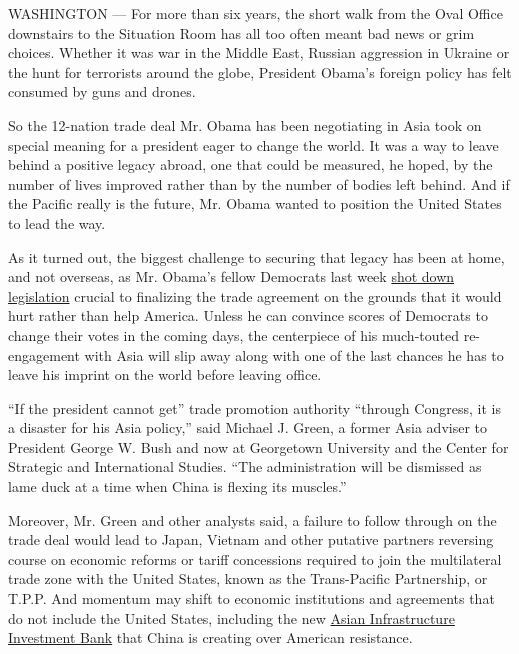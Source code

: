 WASHINGTON --- For more than six years, the short walk from the Oval
Office downstairs to the Situation Room has all too often meant bad news
or grim choices. Whether it was war in the Middle East, Russian
aggression in Ukraine or the hunt for terrorists around the globe,
President Obama's foreign policy has felt consumed by guns and drones.

So the 12-nation trade deal Mr. Obama has been negotiating in Asia took
on special meaning for a president eager to change the world. It was a
way to leave behind a positive legacy abroad, one that could be
measured, he hoped, by the number of lives improved rather than by the
number of bodies left behind. And if the Pacific really is the future,
Mr. Obama wanted to position the United States to lead the way.

As it turned out, the biggest challenge to securing that legacy has been
at home, and not overseas, as Mr. Obama's fellow Democrats last week
\href{http://www.nytimes.com/2015/06/13/us/politics/obamas-trade-bills-face-tough-battle-against-house-democrats.html}{shot
down legislation} crucial to finalizing the trade agreement on the
grounds that it would hurt rather than help America. Unless he can
convince scores of Democrats to change their votes in the coming days,
the centerpiece of his much-touted re-engagement with Asia will slip
away along with one of the last chances he has to leave his imprint on
the world before leaving office.

``If the president cannot get'' trade promotion authority ``through
Congress, it is a disaster for his Asia policy,'' said Michael J. Green,
a former Asia adviser to President George W. Bush and now at Georgetown
University and the Center for Strategic and International Studies. ``The
administration will be dismissed as lame duck at a time when China is
flexing its muscles.''

Moreover, Mr. Green and other analysts said, a failure to follow through
on the trade deal would lead to Japan, Vietnam and other putative
partners reversing course on economic reforms or tariff concessions
required to join the multilateral trade zone with the United States,
known as the Trans-Pacific Partnership, or T.P.P. And momentum may shift
to economic institutions and agreements that do not include the United
States, including the new
\href{http://www.nytimes.com/2015/04/03/world/asia/china-asian-infrastructure-investment-bank.html}{Asian
Infrastructure Investment Bank} that China is creating over American
resistance.

